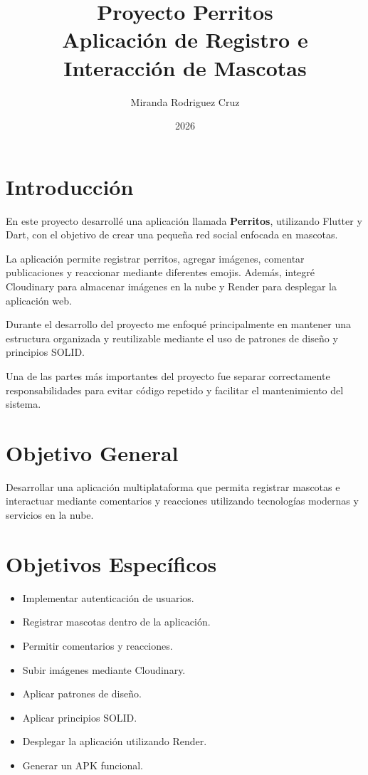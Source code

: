\documentclass[12pt]{article}
\title{
Proyecto Perritos \\ 
Aplicación de Registro e Interacción de Mascotas
}
\author{
Miranda Rodriguez Cruz
}
\date{2026}
\begin{document}
\maketitle

\tableofcontents

\newpage


\section{Introducción}

En este proyecto desarrollé una aplicación llamada \textbf{Perritos}, utilizando Flutter y Dart, con el objetivo de crear una pequeña red social enfocada en mascotas.

La aplicación permite registrar perritos, agregar imágenes, comentar publicaciones y reaccionar mediante diferentes emojis. Además, integré Cloudinary para almacenar imágenes en la nube y Render para desplegar la aplicación web.

Durante el desarrollo del proyecto me enfoqué principalmente en mantener una estructura organizada y reutilizable mediante el uso de patrones de diseño y principios SOLID.

Una de las partes más importantes del proyecto fue separar correctamente responsabilidades para evitar código repetido y facilitar el mantenimiento del sistema.


\section{Objetivo General}

Desarrollar una aplicación multiplataforma que permita registrar mascotas e interactuar mediante comentarios y reacciones utilizando tecnologías modernas y servicios en la nube.

\section{Objetivos Específicos}

\begin{itemize}
    \item Implementar autenticación de usuarios.
    \item Registrar mascotas dentro de la aplicación.
    \item Permitir comentarios y reacciones.
    \item Subir imágenes mediante Cloudinary.
    \item Aplicar patrones de diseño.
    \item Aplicar principios SOLID.
    \item Desplegar la aplicación utilizando Render.
    \item Generar un APK funcional.
\end{itemize}
\end{document}
